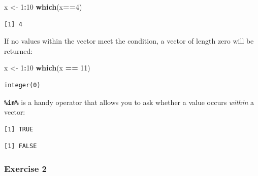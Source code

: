 \documentclass[
]{book}
\newenvironment{Shaded}{\begin{snugshade}}{\end{snugshade}}
\newcommand{\DecValTok}[1]{\textcolor[rgb]{0.00,0.00,0.81}{#1}}
\newcommand{\KeywordTok}[1]{\textcolor[rgb]{0.13,0.29,0.53}{\textbf{#1}}}
\newcommand{\NormalTok}[1]{#1}
\newcommand{\OperatorTok}[1]{\textcolor[rgb]{0.81,0.36,0.00}{\textbf{#1}}}
\newcommand{\StringTok}[1]{\textcolor[rgb]{0.31,0.60,0.02}{#1}}
\begin{document}
\begin{Shaded}
\begin{Highlighting}[]
\NormalTok{x <-}\StringTok{ }\DecValTok{1}\OperatorTok{:}\DecValTok{10}
\KeywordTok{which}\NormalTok{(x}\OperatorTok{==}\DecValTok{4}\NormalTok{)}
\end{Highlighting}
\end{Shaded}

\begin{verbatim}
[1] 4
\end{verbatim}

If no values within the vector meet the condition, a vector of length zero will be returned:

\begin{Shaded}
\begin{Highlighting}[]
\NormalTok{x <-}\StringTok{ }\DecValTok{1}\OperatorTok{:}\DecValTok{10}
\KeywordTok{which}\NormalTok{(x }\OperatorTok{==}\StringTok{ }\DecValTok{11}\NormalTok{)}
\end{Highlighting}
\end{Shaded}

\begin{verbatim}
integer(0)
\end{verbatim}

\textbf{\texttt{\%in\%}} is a handy operator that allows you to ask whether a value occurs \emph{within} a vector:

\begin{Shaded}
\end{Shaded}

\begin{verbatim}
[1] TRUE
\end{verbatim}

\begin{Shaded}
\end{Shaded}

\begin{verbatim}
[1] FALSE
\end{verbatim}

\hypertarget{exercise-2-1}{%
\subsubsection*{Exercise 2}\label{exercise-2-1}}
\end{document}
